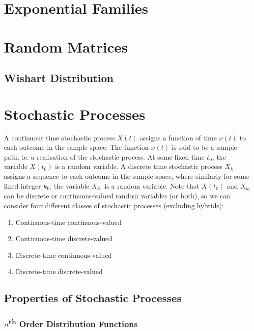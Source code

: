 \documentclass[11pt]{report} %
\begin{document}
\section{Exponential Families}

\section{Random Matrices}

\subsection{Wishart Distribution}

\section{Stochastic Processes}

A continuous time stochastic process $X\left(t\right)$ assigns a function of time $x\left(t\right)$ to each outcome in the sample space. The function $x\left(t\right)$ is said to be a sample path, ie. a realisation of the stochastic process. At some fixed time $t_{0}$, the variable $X\left(t_{0}\right)$ is a random variable. A discrete time stochastic process $X_{k}$ assigns a sequence to each outcome in the sample space, where similarly for some fixed integer $k_{0}$, the variable $X_{k_{0}}$ is a random variable. Note that $X\left(t_{0}\right)$ and $X_{k_{0}}$ can be discrete or continuous-valued random variables (or both), so we can consider four different classes of stochastic processes (excluding hybrids):
\begin{enumerate}
\item Continuous-time continuous-valued
\item Continuous-time discrete-valued
\item Discrete-time continuous-valued
\item Discrete-time discrete-valued
\end{enumerate}

\subsection{Properties of Stochastic Processes}

\subsubsection{$n$\textsuperscript{th} Order Distribution Functions}
\end{document}
